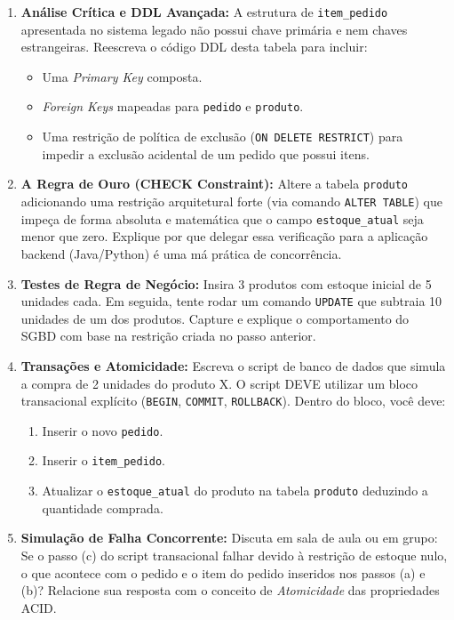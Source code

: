 \begin{enumerate}
    \item \textbf{Análise Crítica e DDL Avançada:} A estrutura de \texttt{item\_pedido} apresentada no sistema legado não possui chave primária e nem chaves estrangeiras. Reescreva o código DDL desta tabela para incluir:
    \begin{itemize}
        \item Uma \textit{Primary Key} composta.
        \item \textit{Foreign Keys} mapeadas para \texttt{pedido} e \texttt{produto}.
        \item Uma restrição de política de exclusão (\texttt{ON DELETE RESTRICT}) para impedir a exclusão acidental de um pedido que possui itens.
    \end{itemize}
    \item \textbf{A Regra de Ouro (CHECK Constraint):} Altere a tabela \texttt{produto} adicionando uma restrição arquitetural forte (via comando \texttt{ALTER TABLE}) que impeça de forma absoluta e matemática que o campo \texttt{estoque\_atual} seja menor que zero. Explique por que delegar essa verificação para a aplicação backend (Java/Python) é uma má prática de concorrência.
    \item \textbf{Testes de Regra de Negócio:} Insira 3 produtos com estoque inicial de 5 unidades cada. Em seguida, tente rodar um comando \texttt{UPDATE} que subtraia 10 unidades de um dos produtos. Capture e explique o comportamento do SGBD com base na restrição criada no passo anterior.
    \item \textbf{Transações e Atomicidade:} Escreva o script de banco de dados que simula a compra de 2 unidades do produto X. O script DEVE utilizar um bloco transacional explícito (\texttt{BEGIN}, \texttt{COMMIT}, \texttt{ROLLBACK}). Dentro do bloco, você deve:
    \begin{enumerate}
        \item Inserir o novo \texttt{pedido}.
        \item Inserir o \texttt{item\_pedido}.
        \item Atualizar o \texttt{estoque\_atual} do produto na tabela \texttt{produto} deduzindo a quantidade comprada.
    \end{enumerate}
    \item \textbf{Simulação de Falha Concorrente:} Discuta em sala de aula ou em grupo: Se o passo (c) do script transacional falhar devido à restrição de estoque nulo, o que acontece com o pedido e o item do pedido inseridos nos passos (a) e (b)? Relacione sua resposta com o conceito de \textit{Atomicidade} das propriedades ACID.
\end{enumerate}

